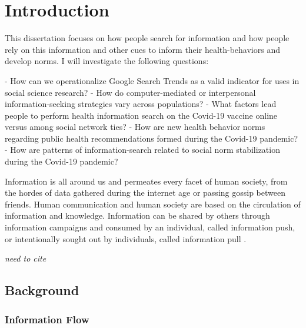 \hypertarget{intro}{%
\chapter{Introduction}\label{intro}}


This dissertation focuses on how people search for information and how
people rely on this information and other cues to inform their
health-behaviors and develop norms. I will investigate the following
questions: 

- How can we operationalize Google Search Trends as a valid indicator for uses in social science research?    
- How do computer-mediated or interpersonal information-seeking strategies vary
across populations?
- What factors lead people to perform health information search on the Covid-19 vaccine online versus among social network ties? 
- How are new health behavior norms regarding public health recommendations formed during the Covid-19 pandemic?  
- How are patterns of information-search related to social norm stabilization during the Covid-19 pandemic?  

Information is all around us and permeates every facet of human society,
from the hordes of data gathered during the internet age or passing
gossip between friends. Human communication and human society are based
on the circulation of information and knowledge. Information can be
shared by others through information campaigns and consumed by an
individual, called information push, or intentionally sought out by
individuals, called information pull \citep{cybenkoFoundationsInformationPush1999}.

\emph{need to cite \citep{bayer_etal20, bossetta18}}

\section{Background}

\subsection{Information Flow}

